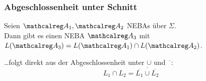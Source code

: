     \begin{frame}
      \frametitle{Abgeschlossenheit unter Schnitt}

      \begin{Lemma}
        Seien $\Aut{A}_1,\Aut{A}_2$ NEBAs über $\Sigma$.\\
        Dann gibt es einen NEBA $\Aut{A}_3$ mit $L(\Aut{A}_3) = L(\Aut{A}_1) \cap L(\Aut{A}_2)$.
        \label{lem:abgeschlossenheit_schnitt}%
      \end{Lemma}
      
      \par\medskip
      \dots folgt direkt aus der Abgeschlossenheit unter $\cup$ und $\overline{\phantom{o}}$:
      \[
        L_1 \cap L_2 = \overline{\overline{L_1} \cup \overline{L_2}}
      \]
      
      \par\bigskip


    \end{frame}

